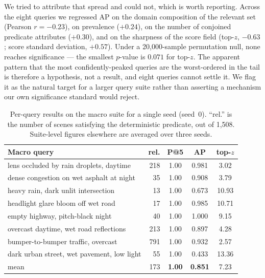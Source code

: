 \documentclass[10pt,twocolumn,letterpaper]{article}
\begin{document}
We tried to attribute that spread and could not, which is worth reporting.
Across the eight queries we regressed AP on the domain composition of the
relevant set (Pearson $r=-0.23$), on prevalence ($+0.24$), on the number of
conjoined predicate attributes ($+0.30$), and on the sharpness of the score
field (top-$z$, $-0.63$; score standard deviation, $+0.57$). Under a
20{,}000-sample permutation null, none reaches significance --- the smallest
$p$-value is $0.071$ for top-$z$. The apparent pattern that the most
confidently-peaked queries are the worst-ordered in the tail is therefore
a hypothesis, not a result, and eight queries cannot settle it. We flag it
as the natural target for a larger query suite rather than asserting a
mechanism our own significance standard would reject.

\begin{table}[t]\centering\scriptsize
\setlength{\tabcolsep}{3pt}
\begin{tabular}{lrccc}
\toprule
Macro query & rel. & P@5 & AP & top-$z$ \\
\midrule
lens occluded by rain droplets, daytime      & 218 & 1.00 & 0.981 & 3.02 \\
dense congestion on wet asphalt at night     &  35 & 1.00 & 0.908 & 3.79 \\
heavy rain, dark unlit intersection          &  13 & 1.00 & 0.673 & 10.93 \\
headlight glare bloom off wet road           &  17 & 1.00 & 0.985 & 10.71 \\
empty highway, pitch-black night             &  40 & 1.00 & 1.000 & 9.15 \\
overcast daytime, wet road reflections       & 213 & 1.00 & 0.897 & 4.28 \\
bumper-to-bumper traffic, overcast           & 791 & 1.00 & 0.932 & 2.57 \\
dark urban street, wet pavement, low light   &  55 & 1.00 & 0.433 & 13.36 \\
\midrule
mean                                         & 173 & \textbf{1.00} & \textbf{0.851} & 7.23 \\
\bottomrule
\end{tabular}
\caption{Per-query results on the macro suite for a single seed (seed~0).
``rel.'' is the number of scenes satisfying the deterministic predicate, out
of 1{,}508. Suite-level figures elsewhere are averaged over three seeds.}
\label{tab:perquery}
\end{table}
\end{document}

